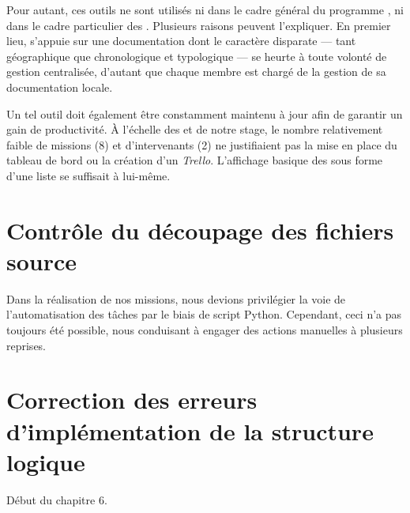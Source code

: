 Pour autant, ces outils ne sont utilisés ni dans le cadre général du programme \timeus, ni dans le cadre particulier des \odm. Plusieurs raisons peuvent l'expliquer. En premier lieu, \timeus{} s'appuie sur une documentation dont le caractère disparate --- tant géographique que chronologique et typologique --- se heurte à toute volonté de gestion centralisée, d'autant que chaque membre est chargé de la gestion de sa documentation locale.

Un tel outil doit également être constamment maintenu à jour afin de garantir un gain de productivité. À l'échelle des \odm{} et de notre stage, le nombre relativement faible de missions (8) et d'intervenants (2) ne justifiaient pas la mise en place du tableau de bord \gitlab{} ou la création d'un \textit{Trello}. L'affichage basique des \issues{} sous forme d'une liste se suffisait à lui-même.

\chapter{Contrôle du découpage des fichiers source}

Dans la réalisation de nos missions, nous devions privilégier la voie de l’automatisation des tâches par le biais de script Python. Cependant, ceci n’a pas toujours été possible, nous conduisant à engager des actions manuelles à plusieurs reprises.

\chapter[Correction des erreurs d'implémentation]{Correction des erreurs d'implémentation de la structure logique}

Début du chapitre 6.